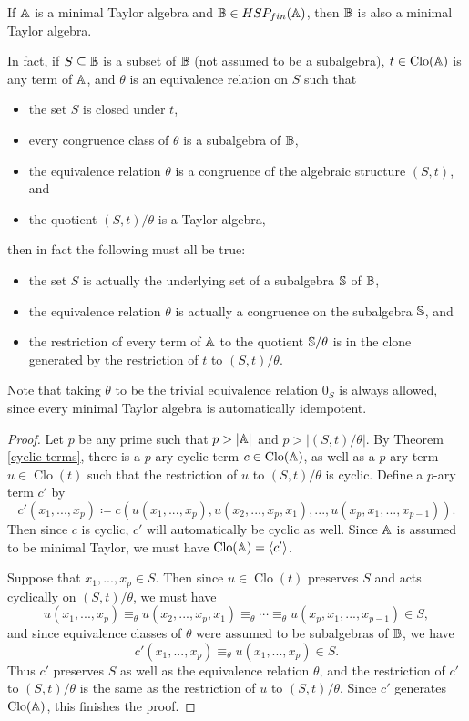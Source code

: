 \documentclass[letterpaper,11pt]{article}
\DeclareMathOperator{\Clo}{Clo}
\begin{document}
\begin{thm}\label{minimal-taylor-subalg} If $\mathbb{A}$ is a minimal Taylor algebra and $\mathbb{B} \in HSP_{fin}(\mathbb{A})$, then $\mathbb{B}$ is also a minimal Taylor algebra.

In fact, if $S \subseteq \mathbb{B}$ is a subset of $\mathbb{B}$ (not assumed to be a subalgebra), $t \in \Clo(\bA)$ is any term of $\mathbb{A}$, and $\theta$ is an equivalence relation on $S$ such that
\begin{itemize}
\item the set $S$ is closed under $t$,
\item every congruence class of $\theta$ is a subalgebra of $\mathbb{B}$,
\item the equivalence relation $\theta$ is a congruence of the algebraic structure $(S,t)$, and
\item the quotient $(S,t)/\theta$ is a Taylor algebra,
\end{itemize}
then in fact the following must all be true:
\begin{itemize}
\item the set $S$ is actually the underlying set of a subalgebra $\mathbb{S}$ of $\mathbb{B}$,
\item the equivalence relation $\theta$ is actually a congruence on the subalgebra $\mathbb{S}$, and
\item the restriction of every term of $\mathbb{A}$ to the quotient $\mathbb{S}/\theta$ is in the clone generated by the restriction of $t$ to $(S,t)/\theta$.
\end{itemize}
Note that taking $\theta$ to be the trivial equivalence relation $0_S$ is always allowed, since every minimal Taylor algebra is automatically idempotent.
\end{thm}
\begin{proof} Let $p$ be any prime such that $p > |\mathbb{A}|$ and $p > |(S,t)/\theta|$. By Theorem \ref{cyclic-terms}, there is a $p$-ary cyclic term $c \in \Clo(\bA)$, as well as a $p$-ary term $u \in \Clo(t)$ such that the restriction of $u$ to $(S,t)/\theta$ is cyclic. Define a $p$-ary term $c'$ by
\[
c'(x_1, ..., x_p) \coloneqq c(u(x_1, ..., x_p), u(x_2, ..., x_p, x_1), ..., u(x_p, x_1, ..., x_{p-1})).
\]
Then since $c$ is cyclic, $c'$ will automatically be cyclic as well. Since $\mathbb{A}$ is assumed to be minimal Taylor, we must have $\Clo(\bA) = \langle c'\rangle$.

Suppose that $x_1, ..., x_p \in S$. Then since $u \in \Clo(t)$ preserves $S$ and acts cyclically on $(S,t)/\theta$, we must have
\[
u(x_1, ..., x_p) \equiv_\theta u(x_2, ..., x_p, x_1) \equiv_\theta \cdots \equiv_\theta u(x_p, x_1, ..., x_{p-1}) \in S,
\]
and since equivalence classes of $\theta$ were assumed to be subalgebras of $\mathbb{B}$, we have
\[
c'(x_1, ..., x_p) \equiv_\theta u(x_1, ..., x_p) \in S.
\]
Thus $c'$ preserves $S$ as well as the equivalence relation $\theta$, and the restriction of $c'$ to $(S,t)/\theta$ is the same as the restriction of $u$ to $(S,t)/\theta$. Since $c'$ generates $\Clo(\bA)$, this finishes the proof.
\end{proof}
\end{document}
